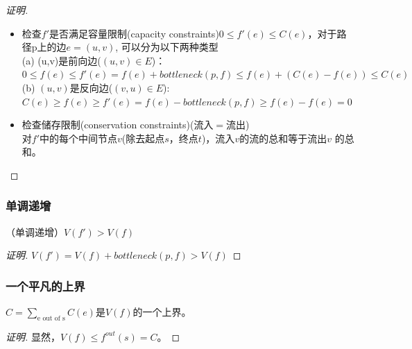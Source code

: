 \begin{figure}[h]
\end{figure}

 \begin{proof}[证明]
  \begin{itemize}
 \item 检查$f'$是否满足容量限制(capacity constraints)$0\leq f'(e)\leq C(e)$，对于路径p上的边$e=(u,v)$, 可以分为以下两种类型\\
 (a) (u,v)是前向边($(u,v)\in E$)：\\
 $0\leq f(e) \leq f'(e) = f(e) + bottleneck(p, f) \leq f(e) + (C(e) - f(e)) \leq C(e) $\\
(b) $(u,v) $是反向边($(v,u) \in E  $): \\
$C(e) \geq f(e) \geq f'(e) = f(e) - bottleneck(p, f) \geq f(e) - f(e) = 0$
\item 检查储存限制(conservation constraints)(流入$=$流出)\\
对$f'$中的每个中间节点$v$(除去起点$s$，终点$t$)，流入$v$的流的总和等于流出$v$ 的总和。
\end{itemize}
 \end{proof}
 \subsubsection{单调递增}
 \begin{theorem}
   （单调递增）$V(f')>V(f)$
 \end{theorem}
 \begin{proof}[证明]
   $V(f')=V(f)+bottleneck(p,f)>V(f)$
 \end{proof}
 \subsubsection{一个平凡的上界}
 \begin{theorem}
   $C=\sum_{\text{e out of s}}C(e)$是$V(f)$的一个上界。
 \end{theorem}
 \begin{proof}[证明]
   显然，$V(f)\leq f^{out}(s)=C$。
 \end{proof}
